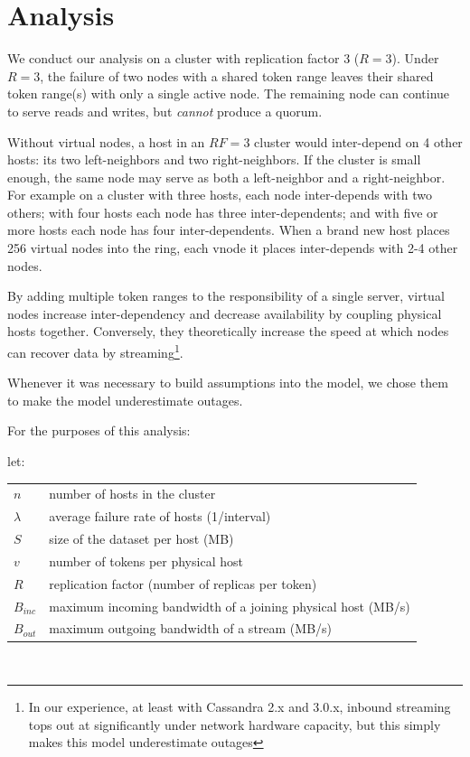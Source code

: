\documentclass{article}
\makeatletter
\newenvironment{conditions}[1][let:]
  {#1 \begin{tabular}[t]{>{$}l<{$} @{${}={}$} l}}
  {\end{tabular}\\[\belowdisplayskip]}
\makeatother
\begin{document}
\section{Analysis}
\label{sec:analysis}

We conduct our analysis on a cluster with replication factor 3 ($R=3$). Under
$R=3$, the failure of two nodes with a shared token range leaves their shared
token range(s) with only a single active node. The remaining node can continue
to serve reads and writes, but \emph{cannot} produce a quorum.

Without virtual nodes, a host in an $RF=3$ cluster would inter-depend on 4
other hosts: its two left-neighbors and two right-neighbors. If the cluster
is small enough, the same node may serve as both a left-neighbor and a
right-neighbor. For example on a cluster with three hosts, each node
inter-depends with two others; with four hosts each node has three
inter-dependents; and with five or more hosts each node has four
inter-dependents. When a brand new host places 256 virtual nodes into the ring, each
vnode it places inter-depends with 2-4 other nodes.

By adding multiple token ranges to the responsibility of a single server,
virtual nodes increase inter-dependency and decrease availability by
coupling physical hosts together. Conversely, they theoretically increase the
speed at which nodes can recover data by streaming\footnote{In our experience,
at least with Cassandra 2.x and 3.0.x, inbound streaming tops out at significantly
under network hardware capacity, but this simply makes this model underestimate outages}.

Whenever it was necessary to build assumptions into the model, we chose them to make
the model underestimate outages.

For the purposes of this analysis:

\begin{conditions}
 n       &  number of hosts in the cluster \\
 \lambda &  average failure rate of hosts (1/interval) \\
 S       &  size of the dataset per host (MB) \\
 v       &  number of tokens per physical host \\
 R       &  replication factor (number of replicas per token) \\
 B_{inc} &  maximum incoming bandwidth of a joining physical host (MB/s) \\
 B_{out} &  maximum outgoing bandwidth of a stream (MB/s) \\
\end{conditions}
\end{document}
